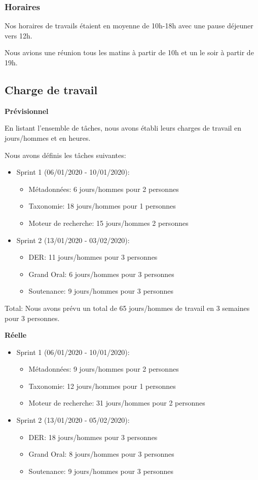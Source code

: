 \subsubsection{Horaires}
Nos horaires de travails étaient en moyenne de 10h-18h avec une pause déjeuner vers 12h.

Nous avions une réunion tous les matins à partir de 10h et un le soir à partir de 19h.


\subsection{Charge de travail}
\textbf{Prévisionnel}


En listant l'ensemble de tâches, nous avons établi leurs charges de travail en jours/hommes et en heures. 

Nous avons définis les tâches suivantes:
\begin{itemize}
\item Sprint 1 (06/01/2020 - 10/01/2020):
\begin{itemize}
\item Métadonnées: 6 jours/hommes pour 2 personnes
\item Taxonomie: 18 jours/hommes pour 1 personnes
\item Moteur de recherche: 15 jours/hommes 2 personnes 
\end{itemize}

\item Sprint 2 (13/01/2020 - 03/02/2020):
\begin{itemize}
\item DER\@: 11 jours/hommes pour 3 personnes
\item Grand Oral: 6 jours/hommes pour 3 personnes
\item Soutenance:  9 jours/hommes pour 3 personnes 
\end{itemize}
\end{itemize}


Total:  Nous avons prévu un total de 65 jours/hommes de travail en 3 semaines pour 3 personnes. 


\textbf{Réelle}
\begin{itemize}
\item Sprint 1 (06/01/2020 - 10/01/2020):
\begin{itemize}
\item Métadonnées: 9 jours/hommes pour 2 personnes
\item Taxonomie: 12 jours/hommes pour 1 personnes
\item Moteur de recherche: 31 jours/hommes pour 2 personnes 
\end{itemize}

\item Sprint 2 (13/01/2020 - 05/02/2020):
\begin{itemize}
\item DER\@: 18 jours/hommes pour 3 personnes
\item Grand Oral: 8 jours/hommes pour 3 personnes
\item Soutenance:  9 jours/hommes pour 3 personnes
\end{itemize}
\end{itemize}

